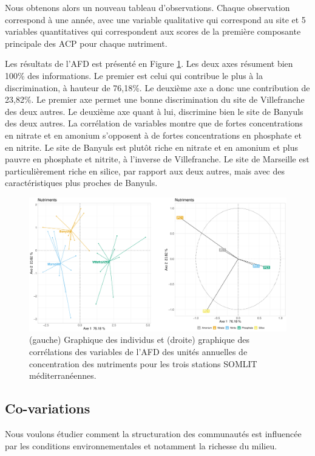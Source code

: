 \documentclass[12pt]{article}
\begin{document}
Nous obtenons alors un nouveau tableau d’observations. Chaque observation correspond à une année, avec une variable qualitative qui correspond au site et 5 variables quantitatives qui correspondent aux scores de la première composante principale des ACP pour chaque nutriment. 

Les résultats de l’AFD est présenté en Figure \ref{afd_nut}. Les deux axes résument bien 100\% des informations. Le premier est celui qui contribue le plus à la discrimination, à hauteur de 76,18\%. Le deuxième axe a donc une contribution de 23,82\%. Le premier axe permet une bonne discrimination du site de Villefranche des deux autres. Le deuxième axe quant à lui, discrimine bien le site de Banyuls des deux autres. La corrélation de variables montre que de fortes concentrations en nitrate et en amonium s’opposent à de fortes concentrations en phosphate et en nitrite. Le site de Banyuls est plutôt riche en nitrate et en amonium et plus pauvre en phosphate et nitrite, à l’inverse de  Villefranche. Le site de Marseille est particulièrement riche en silice, par rapport aux deux autres, mais avec des caractéristiques plus proches de Banyuls. 


\begin{figure}
\centering
\includegraphics[width=.95\textwidth]{fig/R223_FDA_nutri.pdf}
\caption{(gauche) Graphique des individus et (droite) graphique des corrélations des variables de l'AFD des unités annuelles de concentration des nutriments pour les trois stations SOMLIT méditerranéennes.}
\label{afd_nut}
\end{figure}

\subsection{Co-variations}

Nous voulons étudier comment la structuration des communautés est influencée par les conditions environnementales et notamment la richesse du milieu. 
\end{document}
